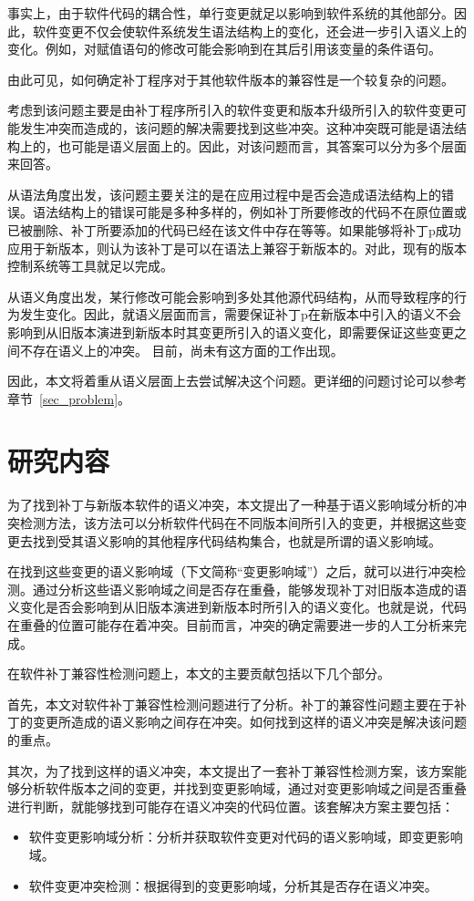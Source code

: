事实上，由于软件代码的耦合性，单行变更就足以影响到软件系统的其他部分\cite{wilkerson2012software,tao2012software}。因此，软件变更不仅会使软件系统发生语法结构上的变化，还会进一步引入语义上的变化。例如，对赋值语句的修改可能会影响到在其后引用该变量的条件语句。

由此可见，如何确定补丁程序对于其他软件版本的兼容性是一个较复杂的问题。

考虑到该问题主要是由补丁程序所引入的软件变更和版本升级所引入的软件变更可能发生冲突而造成的，该问题的解决需要找到这些冲突。这种冲突既可能是语法结构上的，也可能是语义层面上的。因此，对该问题而言，其答案可以分为多个层面来回答。

从语法角度出发，该问题主要关注的是在应用过程中是否会造成语法结构上的错误。语法结构上的错误可能是多种多样的，例如补丁所要修改的代码不在原位置或已被删除、补丁所要添加的代码已经在该文件中存在等等。如果能够将补丁p成功应用于新版本，则认为该补丁是可以在语法上兼容于新版本的。对此，现有的版本控制系统等工具就足以完成。

从语义角度出发，某行修改可能会影响到多处其他源代码结构，从而导致程序的行为发生变化。因此，就语义层面而言，需要保证补丁p在新版本中引入的语义不会影响到从旧版本演进到新版本时其变更所引入的语义变化，即需要保证这些变更之间不存在语义上的冲突。
目前，尚未有这方面的工作出现。

因此，本文将着重从语义层面上去尝试解决这个问题。更详细的问题讨论可以参考章节~\ref{sec_problem}。


\section{研究内容}

为了找到补丁与新版本软件的语义冲突，本文提出了一种基于语义影响域分析的冲突检测方法，该方法可以分析软件代码在不同版本间所引入的变更，并根据这些变更去找到受其语义影响的其他程序代码结构集合，也就是所谓的语义影响域。

在找到这些变更的语义影响域（下文简称“变更影响域”）之后，就可以进行冲突检测。通过分析这些语义影响域之间是否存在重叠，能够发现补丁对旧版本造成的语义变化是否会影响到从旧版本演进到新版本时所引入的语义变化。也就是说，代码在重叠的位置可能存在着冲突。目前而言，冲突的确定需要进一步的人工分析来完成。

在软件补丁兼容性检测问题上，本文的主要贡献包括以下几个部分。

首先，本文对软件补丁兼容性检测问题进行了分析。补丁的兼容性问题主要在于补丁的变更所造成的语义影响之间存在冲突。如何找到这样的语义冲突是解决该问题的重点。

其次，为了找到这样的语义冲突，本文提出了一套补丁兼容性检测方案，该方案能够分析软件版本之间的变更，并找到变更影响域，通过对变更影响域之间是否重叠进行判断，就能够找到可能存在语义冲突的代码位置。该套解决方案主要包括：
	\begin{itemize}
		\item 软件变更影响域分析：分析并获取软件变更对代码的语义影响域，即变更影响域。
		\item 软件变更冲突检测：根据得到的变更影响域，分析其是否存在语义冲突。
	\end{itemize}
	
